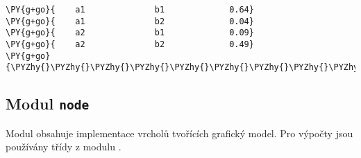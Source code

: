 \begin{fulllineitems}
\begin{Verbatim}[commandchars=\\\{\}]
\PY{g+go}{    a1              b1             0.64}
\PY{g+go}{    a1              b2             0.04}
\PY{g+go}{    a2              b1             0.09}
\PY{g+go}{    a2              b2             0.49}
\PY{g+go}{\PYZhy{}\PYZhy{}\PYZhy{}\PYZhy{}\PYZhy{}\PYZhy{}\PYZhy{}\PYZhy{}\PYZhy{}\PYZhy{}\PYZhy{}\PYZhy{}\PYZhy{}\PYZhy{}\PYZhy{}\PYZhy{}\PYZhy{}\PYZhy{}\PYZhy{}\PYZhy{}\PYZhy{}\PYZhy{}\PYZhy{}\PYZhy{}\PYZhy{}\PYZhy{}\PYZhy{}\PYZhy{}\PYZhy{}\PYZhy{}\PYZhy{}\PYZhy{}\PYZhy{}\PYZhy{}\PYZhy{}\PYZhy{}\PYZhy{}\PYZhy{}\PYZhy{}\PYZhy{}\PYZhy{}\PYZhy{}\PYZhy{}\PYZhy{}\PYZhy{}\PYZhy{}\PYZhy{}\PYZhy{}\PYZhy{}\PYZhy{}}
\end{Verbatim}

\end{fulllineitems}



\subsection{Modul \texttt{node}}
\label{alex.infer:modul-node}
Modul obsahuje implementace vrcholů tvořících grafický model.
Pro výpočty jsou používány třídy z modulu {\hyperref[alex.infer:module-alex.infer.factor]{}}.

